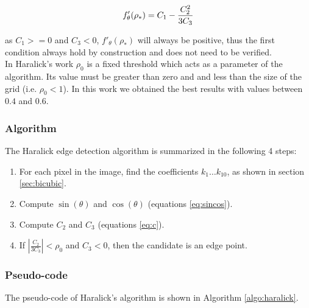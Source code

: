 \documentclass{ipol}
\numberwithin{equation}{section}
\numberwithin{table}{section}
\begin{document}
\begin{equation}\label{eq:cond:first:optim}
f'_{\theta}(\rho_*) = C_1 - \frac{C_2^2}{3C_3}  \\
\end{equation}

as $C_1>=0$ and $C_3<0$, $f'_{\theta}(\rho_*)$ will always be positive, thus the first condition always hold by construction and does not need to be verified.\\

In Haralick's work $\rho_0$ is a fixed threshold which acts as a parameter of the algorithm.
Its value must be greater than zero and and less than the size of the grid (i.e. $\rho_0<1$). In this work we obtained the best results with values between $0.4$ and $0.6$.\\


\subsubsection{Algorithm}

The Haralick edge detection algorithm is summarized in the following 4 steps:

\begin{enumerate}
	\item For each pixel in the image, find the coefficients $k_1 \hdots k_{10}$, as shown in section \ref{sec:bicubic}.
	\item Compute $\sin(\theta)$ and $\cos(\theta)$ (equations \ref{eq:sincos}).
	\item Compute $C_2$ and $C_3$ (equations \ref{eq:c}).
	\item If $\left| \frac{C_2}{3C_3} \right| < \rho_0$ and $C_3 < 0$, then the candidate is an edge point.
\end{enumerate}


\subsubsection{Pseudo-code}

The pseudo-code of Haralick's algorithm is shown in Algorithm \ref{algo:haralick}.
\end{document}
